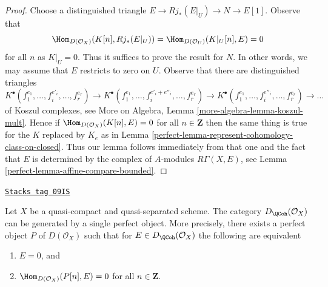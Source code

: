 \begin{proof}

Choose a distinguished triangle $E \to Rj_*(E|_U) \to N \to E[1]$.
Observe that
$$
\Hom_{D(\mathcal{O}_X)}(K[n], Rj_*(E|_U)) =
\Hom_{D(\mathcal{O}_U)}(K|_U[n], E) = 0
$$
for all $n$ as $K|_U = 0$. Thus it suffices to prove the result for
$N$. In other words, we may assume that $E$ restricts to zero on $U$.
Observe that there are distinguished triangles
$$
K^\bullet(f_1^{e_1}, \ldots, f_i^{e'_i}, \ldots, f_r^{e_r}) \to
K^\bullet(f_1^{e_1}, \ldots, f_i^{e'_i + e''_i}, \ldots, f_r^{e_r}) \to
K^\bullet(f_1^{e_1}, \ldots, f_i^{e''_i}, \ldots, f_r^{e_r}) \to \ldots
$$
of Koszul complexes, see
More on Algebra, Lemma \ref{more-algebra-lemma-koszul-mult}.
Hence if $\Hom_{D(\mathcal{O}_X)}(K[n], E) = 0$ for all $n \in \mathbf{Z}$
then the same thing is true for the $K$ replaced by
$K_e$ as in Lemma \ref{perfect-lemma-represent-cohomology-class-on-closed}.
Thus our lemma follows immediately from that one and the fact that $E$
is determined by the complex of $A$-modules $R\Gamma(X, E)$, see
Lemma \ref{perfect-lemma-affine-compare-bounded}.
\end{proof}

\begin{theorem}
\label{perfect-theorem-bondal-van-den-Bergh}
\href{https://stacks.math.columbia.edu/tag/09IS}{\texttt{Stacks tag 09IS}}

Let $X$ be a quasi-compact and quasi-separated scheme. The category
$D_\QCoh(\mathcal{O}_X)$ can be generated by a single
perfect object. More precisely, there exists a perfect object
$P$ of $D(\mathcal{O}_X)$ such that for
$E \in D_\QCoh(\mathcal{O}_X)$ the following are equivalent
\begin{enumerate}
\item $E = 0$, and
\item $\Hom_{D(\mathcal{O}_X)}(P[n], E) = 0$ for all $n \in \mathbf{Z}$.
\end{enumerate}
\end{theorem}

